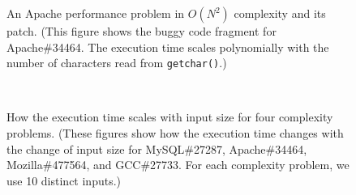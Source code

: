 \begin{figure}
\centering
{}
  \mbox{}
  \vspace{-0.1in}
\caption{An Apache performance problem in $O(N^2)$ complexity and its patch. 
\footnotesize{(This figure shows the buggy code fragment for Apache\#34464. 
 The execution time scales polynomially with the number of characters read from \texttt{getchar()}.)}}
\vspace{-0.05in}
\label{fig:apache34464}
\vspace{-0.3in}
\end{figure}

\begin{figure}
\centering
{} 
 \\ 
\vspace{-0.1in}
\caption{How the execution time scales with input size for four complexity problems. 
\footnotesize{(These figures show how the execution time changes with the change of input size for MySQL\#27287, 
 Apache\#34464, Mozilla\#477564, and GCC\#27733. For each complexity problem, we use 10 distinct inputs.)}} 
 \vspace{-0.05in}
\label{fig:time} 
\vspace{-0.15in}
\end{figure} 

